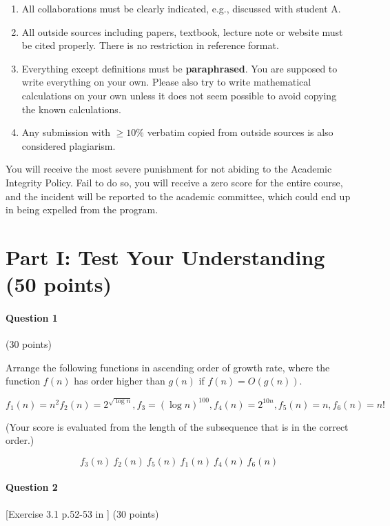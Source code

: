 \documentclass[11pt,letterpaper]{article}
\begin{document}
\begin{enumerate}
	\item All collaborations must be clearly indicated, e.g., discussed with student A. 
	\item All outside sources including papers, textbook, lecture note or website must be cited properly. There is no restriction in reference format. 
	\item Everything except definitions must be {\bf paraphrased}. You are supposed to write everything on your own. Please also try to write mathematical calculations on your own unless it does not seem possible to avoid copying the known calculations.
	\item Any submission with {\bf $\ge 10\%$} verbatim copied from outside sources is also considered plagiarism.
\end{enumerate}

You will receive the most severe punishment for not abiding to the Academic Integrity Policy. Fail to do so, you will receive a zero score for the entire course, and the incident will be reported to the academic committee, which could end up in being expelled from the program. 


\pagebreak

\section*{Part I: Test Your Understanding  (50 points)}


	\paragraph*{Question 1}  (30 points)
	
   Arrange the following functions in ascending order of growth rate, where the function $f(n)$ has order higher than $g(n)$ if $f(n) = O(g(n))$.
   
   $$f_1(n) = n^2  f_2 (n) = 2^{\sqrt{\log n}}, f_3 = (\log n)^100, f_4 (n) = 2^{10 n}, f_5(n)=n, f_6(n) = n!$$

   (Your score is evaluated from the length of the subsequence that is in the correct order.)


    $$
    f_3(n) \ f_2(n) \ f_5(n) \ f_1(n) \ f_4(n) \ f_6(n)
    $$
    
	\medskip


	\paragraph*{Question 2} [Exercise 3.1 p.52-53 in \cite{CLRS09}] (30 points)
	
\end{document}
